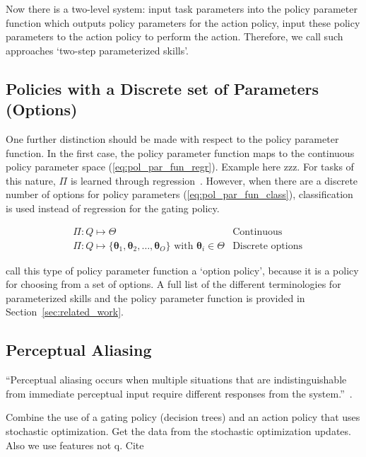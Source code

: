 \documentclass[12pt]{article}
\newcommand{\mymath}[1]{\ensuremath{#1}\xspace}
\newcommand{\app}    {\mymath{\bm{\theta}}}
\newcommand{\appsp}  {\mymath{\Theta}}
\newcommand{\polg}   {\mymath{\Pi}}
\newcommand{\taskpsp}{\mymath{Q}}
\begin{document}
Now there is a two-level system: input task parameters into the policy parameter function which outputs policy parameters for the action policy, input these policy parameters to the action policy to perform the action. Therefore, we call such approaches `two-step parameterized skills'.

\subsection{Policies with a Discrete set of Parameters (Options)}

One further distinction should be made with respect to the policy parameter function. In the first case, the policy parameter function maps to the continuous policy parameter space (\ref{eq:pol_par_fun_regr}). Example here zzz. For tasks of this nature, \polg is learned through regression~\cite{ude10taskspecific,matsubara11learning,silva12learning,stulp13learning}.
However, when there are a discrete number of options for policy parameters (\ref{eq:pol_par_fun_class}), classification is used instead of regression for the gating policy.

\begin{align}
&\polg : \taskpsp \mapsto \appsp & \mbox{Continuous} \label{eq:pol_par_fun_regr}\\
&\polg : \taskpsp \mapsto \{\app_1,\app_2,\dots,\app_O\} \mbox{~with~} \app_i \in \appsp & \mbox{Discrete options} \label{eq:pol_par_fun_class}
\end{align}

\citet{daniel12learning} call this type of policy parameter function a `option policy', because it is a policy for choosing from a set of options. A full list of the different terminologies for parameterized skills and the policy parameter function is provided in Section~\ref{sec:related_work}. 


\subsection{Perceptual Aliasing}

``Perceptual aliasing occurs when multiple situations that are indistinguishable from immediate perceptual input require different responses from the system.''~\cite{chrisman92reinforcement}.

\color{red}Combine the use of a gating policy (decision trees) and an action policy that uses stochastic optimization. Get the data from the stochastic optimization updates. Also we use features not q. Cite \citet{piater11learning}\color{black}
\end{document}
